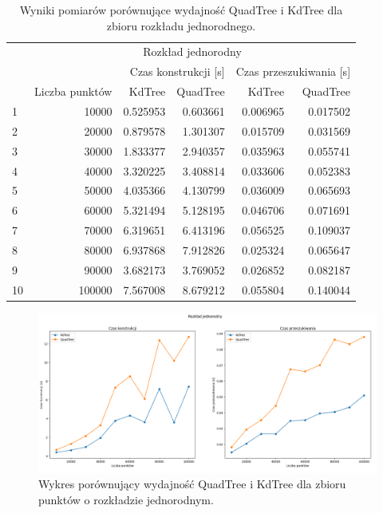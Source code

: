 \documentclass{lab}
\begin{document}
\begin{table}[H]
\centering
\begin{tabular}{lrrrrr}
  \toprule
   & \multicolumn{5}{c}{Rozkład jednorodny} \\
   &  & \multicolumn{2}{r}{Czas konstrukcji [s]} & \multicolumn{2}{r}{Czas przeszukiwania [s]} \\
   & Liczba punktów & KdTree & QuadTree & KdTree & QuadTree \\
  \midrule
1 & 10000 & 0.525953 & 0.603661 & 0.006965 & 0.017502 \\
2 & 20000 & 0.879578 & 1.301307 & 0.015709 & 0.031569 \\
3 & 30000 & 1.833377 & 2.940357 & 0.035963 & 0.055741 \\
4 & 40000 & 3.320225 & 3.408814 & 0.033606 & 0.052383 \\
5 & 50000 & 4.035366 & 4.130799 & 0.036009 & 0.065693 \\
6 & 60000 & 5.321494 & 5.128195 & 0.046706 & 0.071691 \\
7 & 70000 & 6.319651 & 6.413196 & 0.056525 & 0.109037 \\
8 & 80000 & 6.937868 & 7.912826 & 0.025324 & 0.065647 \\
9 & 90000 & 3.682173 & 3.769052 & 0.026852 & 0.082187 \\
10 & 100000 & 7.567008 & 8.679212 & 0.055804 & 0.140044 \\
  \bottomrule
\end{tabular}
\caption{Wyniki pomiarów porównujące wydajność QuadTree i KdTree dla zbioru rozkładu jednorodnego.}
\label{tab:uniform_time}
\end{table}

\begin{figure}[H]
  \centering
  \includegraphics[width=1\textwidth]{resources/uniform_graph.png}
  \caption{Wykres porównujący wydajność QuadTree i KdTree dla zbioru punktów o rozkładzie jednorodnym.}
  \label{fig:uniform_graph}
\end{figure}
\end{document}
